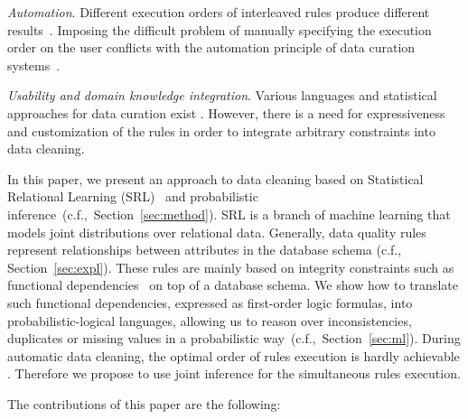 \textit{Automation}. Different execution orders of interleaved rules produce different results~\cite{Dallachiesa:2013:NCD:2463676.2465327}. Imposing the difficult problem of manually specifying the execution order on the user conflicts with the automation principle of data curation systems~\cite{Stonebraker_datacuration}.

\textit{Usability and domain knowledge integration}. Various languages and statistical approaches for data curation exist \cite{Dallachiesa:2013:NCD:2463676.2465327, chu2013holistic, llunaticVDLB2013b}. However, there is a need for expressiveness and customization of the rules in order to integrate arbitrary constraints into data cleaning.  

In this paper, we present an approach to data cleaning based on Statistical Relational Learning (SRL)~\cite{getoor2007introduction} and probabilistic inference~(c.f.,~Section~\ref{sec:method}). SRL is a branch of machine learning that models joint distributions over relational data. Generally, data quality rules represent relationships between attributes in the database schema (c.f., Section~\ref{sec:expl}). These rules are mainly based on integrity constraints such as functional dependencies~\cite{AbiteboulHV95, fan2012foundations} on top of a database schema. We show how to translate such functional dependencies, expressed as first-order logic formulas, into probabilistic-logical languages, allowing us to reason over inconsistencies, duplicates or missing values in a probabilistic way~(c.f.,~Section~\ref{sec:ml}). During automatic data cleaning, the optimal order of rules execution is hardly achievable \cite{Dallachiesa:2013:NCD:2463676.2465327}. Therefore we propose to use joint inference for the simultaneous rules execution.

The contributions of this paper are the following:

